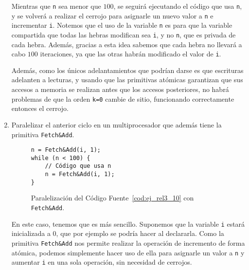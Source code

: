 \begin{ejercicio}
\begin{enumerate}
        Mientras que \verb|n| sea menor que $100$, se seguirá ejecutando el código que usa \verb|n|, y se volverá a realizar el cerrojo para asignarle un nuevo valor a \verb|n| e incrementar \verb|i|.
        Notemos que el uso de la variable \verb|n| es para que la variable compartida que todas las hebras modifican sea \verb|i|, y no \verb|n|, que es privada de cada hebra.
        Además, gracias a esta idea sabemos que cada hebra no llevará a cabo $100$ iteraciones, ya que las otras habrán modificado el valor de \verb|i|.

        Además, como los únicos adelantamientos que podrían darse es que escrituras adelanten a lecturas, y usando que las primitivas
        atómicas garantizan que sus accesos a memoria se realizan antes que los accesos posteriores, no habrá problemas de que la
        orden \verb|k=0| cambie de sitio, funcionando correctamente entonces el cerrojo.

        \item Paralelizar el anterior ciclo en un multiprocesador que además tiene la primitiva \verb|Fetch&Add|.
        
        \begin{figure}[H]
            \centering
            \begin{verbatim}
n = Fetch&Add(i, 1);
while (n < 100) {
    // Código que usa n
    n = Fetch&Add(i, 1);
}
            \end{verbatim}
            \caption{Paralelización del Código Fuente~\ref{cod:ej_rel3_10} con \texttt{Fetch\&Add}.}
            \label{cod:ej_rel3_10_2}
        \end{figure}

        En este caso, tenemos que es más sencillo. Suponemos que la variable \verb|i| estará inicializada a $0$, que por ejemplo se podría hacer al declararla.
        Como la primitiva \verb|Fetch&Add| nos permite realizar la operación de incremento de forma atómica, podemos simplemente hacer uso de ella para asignarle un valor a \verb|n| y aumentar \verb|i| en una sola operación, sin necesidad de cerrojos.
    \end{enumerate}
\end{ejercicio}

